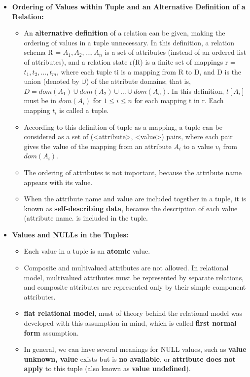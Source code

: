 \documentclass[10pt]{article}
\newcommand{\tf}{\textbf}
\begin{document}
\begin{enumerate}
\begin{itemize}
		\item \tf{Ordering of Values within Tuple and an Alternative Definition of a Relation: }
		\begin{itemize}
			\item An \tf{alternative definition} of a relation can be given, making the ordering of values in a tuple unnecessary. In this definition, a relation schema R = ${A_1, A_2,\ldots, A_n}$ is a set of attributes (instead of an ordered list of attributes), and a relation state r(R) is a finite set of mappings r = ${t_1, t_2,\ldots, t_m}$, where each tuple ti is a mapping from R to D, and D is the union (denoted by $\cup$) of the attribute domains; that is, $D = dom(A_1) \cup dom(A_2) \cup \ldots \cup dom(A_n)$. In this definition, $t[A_i]$ must be in $dom(A_i)$ for $1 \le i \le n$ for each mapping t in r. Each mapping $t_i$ is called a tuple.
			\item According to this definition of tuple as a mapping, a tuple can be considered as a set of (<attribute>, <value>) pairs, where each pair gives the value of the mapping from an attribute $A_i$ to a value $v_i$ from $dom(A_i)$.
			\item The ordering of attributes is not important, because the attribute name appears with its value.
			\item When the attribute name and value are included together in a tuple, it is known as \tf{self-describing data}, because the description of each value (attribute name. is included in the tuple.
		\end{itemize}

		\item \tf{Values and NULLs in the Tuples: }
		\begin{itemize}
			\item Each value in a tuple is an \tf{atomic} value.
			\item Composite and multivalued attributes are not allowed. In relational model, multivalued attributes must be represented by separate relations, and composite attributes are represented only by their simple component attributes.
			\item \tf{flat relational model}, must of theory behind the relational model was developed with this assumption in mind, which is called \tf{first normal form} assumption.
			\item In general, we can have several meanings for NULL values, such as \tf{value unknown, value} exists but is \tf{no available}, or \tf{attribute does not apply} to this tuple (also known as \tf{value undefined}).
		\end{itemize}


\end{itemize}
\end{enumerate}
\end{document}
